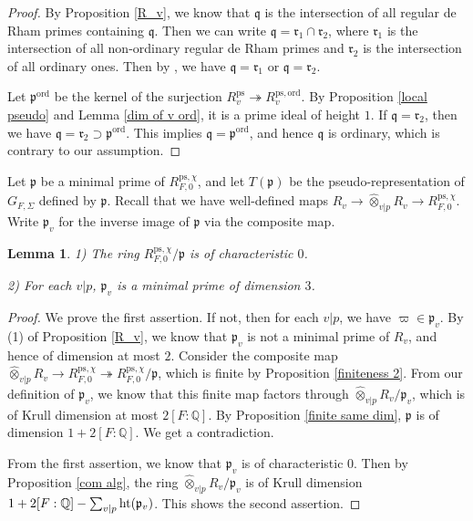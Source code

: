 \documentclass[a4paper, 12pt]{amsart}
\newtheorem{lem}[thm]{Lemma}
\def\ps{\mathrm{ps}}
\def\ord{\mathrm{ord}}
\newcommand{\Q}{\mathbb{Q}}
\newcommand{\kq}{\mathfrak{q}}
\newcommand{\kp}{\mathfrak{p}}
\begin{document}
       \begin{proof}
       	By Proposition \ref{R_v}, we know that $\kq$ is the intersection of all regular de Rham primes containing $\kq$. Then we can write $\kq = \mathfrak{r}_1 \cap \mathfrak{r}_2$, where $\mathfrak{r}_1$ is the intersection of all non-ordinary regular de Rham primes and $\mathfrak{r}_2$ is the intersection of all ordinary ones. Then by \cite[Lemma 10.15.1]{stacks-project}, we have $\kq = \mathfrak{r}_1 $ or $\kq=\mathfrak{r}_2$.
       	
       	Let $\kp^{\ord}$ be the kernel of the surjection $R_v^\ps \twoheadrightarrow R_v^{\ps, \ord}$. By Proposition \ref{local pseudo} and Lemma \ref{dim of v ord}, it is a prime ideal of height $1$. If $\kq=\mathfrak{r}_2 $, then we have $\kq = \mathfrak{r}_2 \supset \kp^{\ord}$. This implies $ \kq = \kp^{\ord} $, and hence $\kq$ is ordinary, which is contrary to our assumption.
         \end{proof}
    
    Let $\kp$ be a minimal prime of $R_{F, 0}^{\ps, \chi} $, and let $T(\kp) $ be the pseudo-representation of $G_{F, \Sigma}$ defined by $\kp$. Recall that we have well-defined maps $R_v \to \widehat{\otimes}_{v |p} R_{v} \to R_{F, 0}^{\ps, \chi}$. Write $\kp_v$ for the inverse image of $\kp$ via the composite map.
    
    \begin{lem}\label{char 0}
    	1) The ring $R_{F, 0}^{\ps, \chi}/\kp $ is of characteristic $0$.
    	
    	2) For each $v|p$, $\kp_v$ is a minimal prime of dimension $3$.
    \end{lem}
    
    \begin{proof}
    	We prove the first assertion. If not, then for each $v|p$,  we have $\varpi \in \kp_v$. By (1) of Proposition \ref{R_v}, we know that $\kp_v$ is not a minimal prime of $R_v$, and hence of dimension at most $2$. Consider the composite map $\widehat{\otimes}_{v |p} R_{v} \to R_{F, 0}^{\ps, \chi} \twoheadrightarrow R_{F, 0}^{\ps, \chi}/\kp$, which is finite by Proposition \ref{finiteness 2}. From our definition of $\kp_v$, we know that this finite map factors through $\widehat{\otimes}_{v |p} R_{v}/\kp_v$, which is of Krull dimension at most $2[F:\Q]$. By Proposition \ref{finite same dim}, $\kp$ is of dimension $1+2[F: \Q]$. We get a contradiction.
    	
    	From the first assertion, we know that $\kp_v$ is of characteristic $0$. Then by Proposition \ref{com alg}, the ring $\widehat{\otimes}_{v |p} R_{v}/\kp_v$ is of Krull dimension $1+ 2[F: \Q] - \sum_{v|p} \textnormal{ht}(\kp_v)$. This shows the second assertion.
    \end{proof}
    
\end{document}
